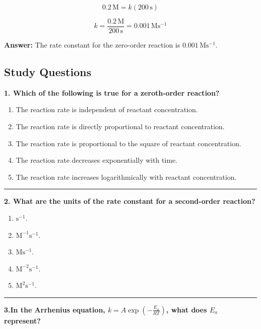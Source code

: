 \documentclass[
  9pt,
]{extbook}
\providecommand{\tightlist}{%
  \setlength{\itemsep}{0pt}\setlength{\parskip}{0pt}}
\theoremstyle{definition}
\theoremstyle{definition}
\theoremstyle{definition}
\theoremstyle{definition}
\theoremstyle{remark}
\begin{document}
\[0.2\,\text{M} = k(200\,\text{s})\]

\[k = \frac{0.2\,\text{M}}{200\,\text{s}} = 0.001\,\text{M}\text{s}^{-1}\]

\textbf{Answer:} The rate constant for the zero-order reaction is \(0.001\,\text{M}\text{s}^{-1}\).

\subsection{Study Questions}\label{quest15}

\textbf{1. Which of the following is true for a zeroth-order reaction?}

\begin{enumerate}
\def\labelenumi{\alph{enumi}.}
\tightlist
\item
  The reaction rate is independent of reactant concentration.
\item
  The reaction rate is directly proportional to reactant concentration.
\item
  The reaction rate is proportional to the square of reactant concentration.
\item
  The reaction rate decreases exponentially with time.
\item
  The reaction rate increases logarithmically with reactant concentration.
\end{enumerate}

\begin{center}\rule{0.5\linewidth}{0.5pt}\end{center}

\textbf{2. What are the units of the rate constant for a second-order reaction?}

\begin{enumerate}
\def\labelenumi{\alph{enumi}.}
\tightlist
\item
  \(\text{s}^{-1}\).
\item
  \(\text{M}^{-1}\text{s}^{-1}\).
\item
  \(\text{M}\text{s}^{-1}\).
\item
  \(\text{M}^{-2}\text{s}^{-1}\).
\item
  \(\text{M}^2\text{s}^{-1}\).
\end{enumerate}

\begin{center}\rule{0.5\linewidth}{0.5pt}\end{center}

\textbf{3.In the Arrhenius equation, \(k = A\exp(-\frac{E_a}{RT})\), what does \(E_a\) represent?}
\end{document}
